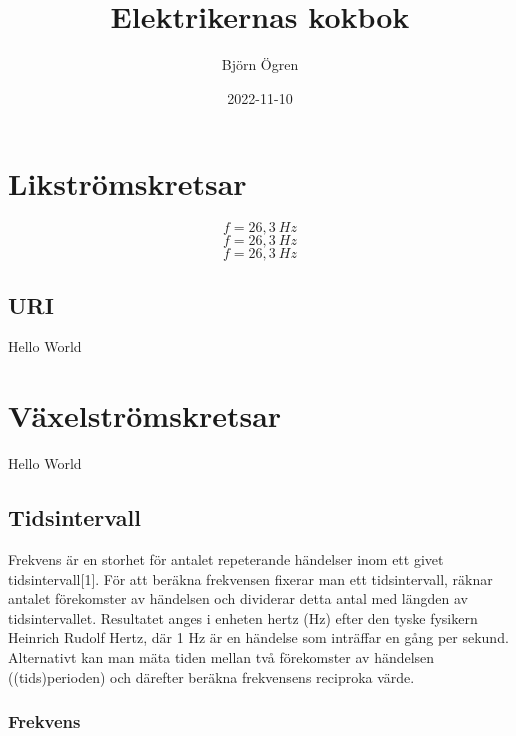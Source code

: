 \documentclass[
]{book}
\title{Elektrikernas kokbok}
\author{Björn Ögren}
\date{2022-11-10}
\begin{document}
\maketitle

{
\setcounter{tocdepth}{1}
\tableofcontents
}
\hypertarget{likstruxf6mskretsar}{%
\chapter{Likströmskretsar}\label{likstruxf6mskretsar}}

\[ f = 26,3 \ Hz  \]
\[ f = 26,3 \ Hz  \]
\[ f = 26,3 \ Hz  \]

\hypertarget{uri}{%
\section{URI}\label{uri}}

Hello World

\hypertarget{vuxe4xelstruxf6mskretsar}{%
\chapter{Växelströmskretsar}\label{vuxe4xelstruxf6mskretsar}}

Hello World

\hypertarget{tidsintervall}{%
\section{Tidsintervall}\label{tidsintervall}}

Frekvens är en storhet för antalet
repeterande händelser inom ett givet
tidsintervall{[}1{]}. För att beräkna
frekvensen fixerar man ett
tidsintervall, räknar antalet
förekomster av händelsen och
dividerar detta antal med längden av
tidsintervallet. Resultatet anges i
enheten hertz (Hz) efter den tyske
fysikern Heinrich Rudolf Hertz, där
1 Hz är en händelse som inträffar en
gång per sekund. Alternativt kan man
mäta tiden mellan två förekomster av
händelsen ((tids)perioden) och
därefter beräkna frekvensens
reciproka värde.

\hypertarget{frekvens}{%
\subsection{Frekvens}\label{frekvens}}
\end{document}
